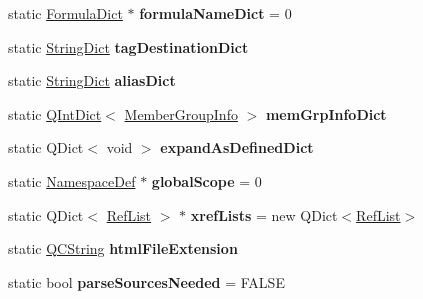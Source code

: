 \begin{DoxyCompactItemize}
\item 
\hypertarget{class_doxygen_a2369813a8aff3cfbcbdc136c46e4e056}{static \hyperlink{class_formula_dict}{Formula\-Dict} $\ast$ {\bfseries formula\-Name\-Dict} = 0}\label{class_doxygen_a2369813a8aff3cfbcbdc136c46e4e056}

\item 
\hypertarget{class_doxygen_a8ac87f41e091fbb8588e7ffeb45d95e7}{static \hyperlink{class_string_dict}{String\-Dict} {\bfseries tag\-Destination\-Dict}}\label{class_doxygen_a8ac87f41e091fbb8588e7ffeb45d95e7}

\item 
\hypertarget{class_doxygen_af90c1249145bd247303f77106d3962ca}{static \hyperlink{class_string_dict}{String\-Dict} {\bfseries alias\-Dict}}\label{class_doxygen_af90c1249145bd247303f77106d3962ca}

\item 
\hypertarget{class_doxygen_aa3497ff52b258c6e11ee796e134067a1}{static \hyperlink{class_q_int_dict}{Q\-Int\-Dict}$<$ \hyperlink{struct_member_group_info}{Member\-Group\-Info} $>$ {\bfseries mem\-Grp\-Info\-Dict}}\label{class_doxygen_aa3497ff52b258c6e11ee796e134067a1}

\item 
\hypertarget{class_doxygen_a8975ec8fc93c78ed2178fd83980114f9}{static Q\-Dict$<$ void $>$ {\bfseries expand\-As\-Defined\-Dict}}\label{class_doxygen_a8975ec8fc93c78ed2178fd83980114f9}

\item 
\hypertarget{class_doxygen_ac7b2d3c69b96657a57cfd34607a90a02}{static \hyperlink{class_namespace_def}{Namespace\-Def} $\ast$ {\bfseries global\-Scope} = 0}\label{class_doxygen_ac7b2d3c69b96657a57cfd34607a90a02}

\item 
\hypertarget{class_doxygen_a472397f01e4a41c07938268677d11792}{static Q\-Dict$<$ \hyperlink{class_ref_list}{Ref\-List} $>$ $\ast$ {\bfseries xref\-Lists} = new Q\-Dict$<$\hyperlink{class_ref_list}{Ref\-List}$>$}\label{class_doxygen_a472397f01e4a41c07938268677d11792}

\item 
\hypertarget{class_doxygen_a4f43a445e703bbb5d310d4ed31f76ad5}{static \hyperlink{class_q_c_string}{Q\-C\-String} {\bfseries html\-File\-Extension}}\label{class_doxygen_a4f43a445e703bbb5d310d4ed31f76ad5}

\item 
\hypertarget{class_doxygen_aa923ac4d38e7e0d29884836e54ee38ed}{static bool {\bfseries parse\-Sources\-Needed} = F\-A\-L\-S\-E}\label{class_doxygen_aa923ac4d38e7e0d29884836e54ee38ed}


\end{DoxyCompactItemize}
